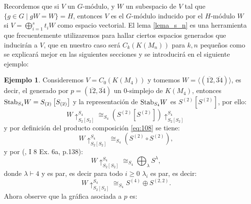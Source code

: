 \documentclass[12pt]{book}
\theoremstyle{definition}
\newtheorem{example}[theorem]{Ejemplo}
\newcounter{in}
\newcounter{ini}
\begin{document}
Recordemos que si $V$ un $G$-módulo, y $W$ un subespacio de $V$ tal
que $\{g\in G\mid gW=W\}=H$, entonces $V$ es el $G$-módulo inducido
por el $H$-módulo $W$ si $V=\bigoplus^{s}_{i=1}t_{i}W$ como espacio
vectorial. El lema \ref{lema_s_n} es una herramienta que
frecuentemente utilizaremos para hallar ciertos espacios generados que
inducirán a $V$, que en nuestro caso será $C_{k}(K(M_n))$ para $k, n$
pequeños como se explicará mejor en las siguientes secciones y se
introducirá en el siguiente ejemplo:
\begin{example}
  Consideremos $V = C_{0}(K(M_4))$ y tomemos
  $W = \langle (\overline{12},\overline{34}) \rangle$, es decir, el
  generado por $p = (\overline{12},\overline{34})$ un $0$-simplejo de $K(M_4)$, entonces
  $\textup{Stab}_{S_{4}} W = S_{(2)} \left [ S_{(2)} \right ]$ y la
  representación de $\textup{Stab}_{S_{4}} W$ es
  $S^{(2)} \left [ S^{(2)} \right ]$, por ello:
\begin{equation}
W \uparrow_{S_{2} \left [ S_{2} \right ]}^{S_{4}} \cong_{S_{4}} (S^{(2)} \left [ S^{(2)} \right ])\uparrow_{S_{2} \left [ S_{2} \right ]}^{S_{4}}
\end{equation}
y por definición del producto composición \ref{eq:108} se tiene:
\begin{equation}
W \uparrow_{S_{2} \left [ S_{2} \right ]}^{S_{4}} \cong_{S_{4}} (S^{(2)} \circ S^{(2)}), 
\end{equation}
y por \normalfont(\cite{macdonald1998symmetric}, I 8 Ex. 6a, p.138):
\begin{equation}
W \uparrow_{S_{2} \left [ S_{2} \right ]}^{S_{4}} \cong_{S_{4}} \bigoplus_{\lambda} S^{\lambda}, 
\end{equation}
donde $\lambda \vdash 4$ y es par, es decir para todo $i \geq 0$
$\lambda_{i}$ es par, es decir:
\begin{equation}
W \uparrow_{S_{2} \left [ S_{2} \right ]}^{S_{4}} \cong_{S_{4}} S^{(4)} \oplus S^{(2,2)}.
\end{equation}
Ahora observe que la gráfica asociada a $p$ es:
\begin{center}

\end{center}
\end{example}
\end{document}
